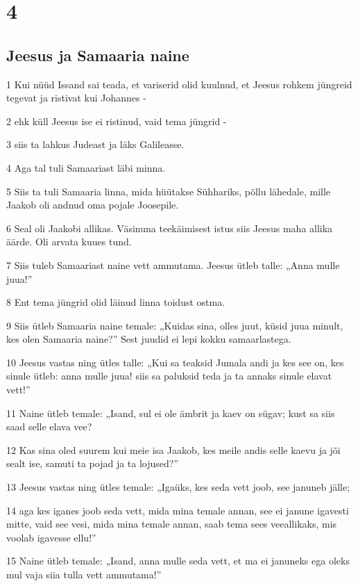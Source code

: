 \chapter{4}

\section*{Jeesus ja Samaaria naine}

\par 1 Kui nüüd Issand sai teada, et variserid olid kuulnud, et Jeesus rohkem jüngreid tegevat ja ristivat kui Johannes -
\par 2 ehk küll Jeesus ise ei ristinud, vaid tema jüngrid -
\par 3 siis ta lahkus Judeast ja läks Galileasse.
\par 4 Aga tal tuli Samaariast läbi minna.
\par 5 Siis ta tuli Samaaria linna, mida hüütakse Sühhariks, põllu lähedale, mille Jaakob oli andnud oma pojale Joosepile.
\par 6 Seal oli Jaakobi allikas. Väsinuna teekäimisest istus siis Jeesus maha allika äärde. Oli arvata kuues tund.
\par 7 Siis tuleb Samaariast naine vett ammutama. Jeesus ütleb talle: „Anna mulle juua!”
\par 8 Ent tema jüngrid olid läinud linna toidust ostma.
\par 9 Siis ütleb Samaaria naine temale: „Kuidas sina, olles juut, küsid juua minult, kes olen Samaaria naine?” Sest juudid ei lepi kokku samaarlastega.
\par 10 Jeesus vastas ning ütles talle: „Kui sa teaksid Jumala andi ja kes see on, kes sinule ütleb: anna mulle juua! siis sa paluksid teda ja ta annaks sinule elavat vett!”
\par 11 Naine ütleb temale: „Isand, sul ei ole ämbrit ja kaev on sügav; kust sa siis saad selle elava vee?
\par 12 Kas sina oled suurem kui meie isa Jaakob, kes meile andis selle kaevu ja jõi sealt ise, samuti ta pojad ja ta lojused?”
\par 13 Jeesus vastas ning ütles temale: „Igaüks, kes seda vett joob, see januneb jälle;
\par 14 aga kes iganes joob seda vett, mida mina temale annan, see ei janune igavesti mitte, vaid see vesi, mida mina temale annan, saab tema sees veeallikaks, mis voolab igavesse ellu!”
\par 15 Naine ütleb temale: „Isand, anna mulle seda vett, et ma ei januneks ega oleks mul vaja siia tulla vett ammutama!”
